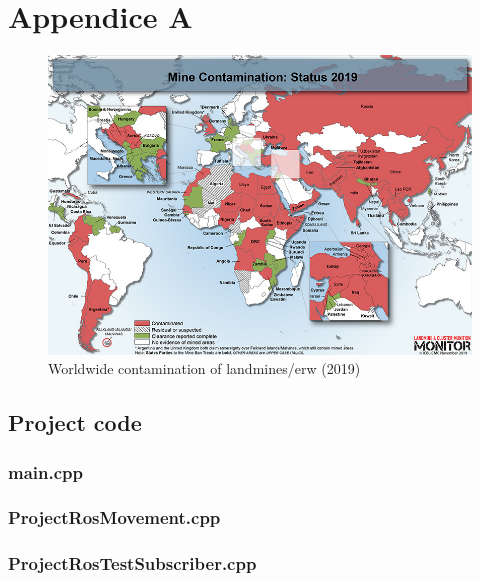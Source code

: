 \appendix

\hypertarget{AppA}{\chapter{Appendice A}}

\begin{figure}[h]
  \centering
  \includegraphics[width=\textwidth]{00 - Images/2019_MBT_Contamination_Final_Full.jpg}
  \caption{Worldwide contamination of landmines/\gls{erw} (2019) \cite{Monitor-Maps:online}}
  \label{fig:contamination_mine_erw}
\end{figure}

\section{Project code}

\subsection{main.cpp}



\subsection{ProjectRosMovement.cpp}



\subsection{ProjectRosTestSubscriber.cpp}

